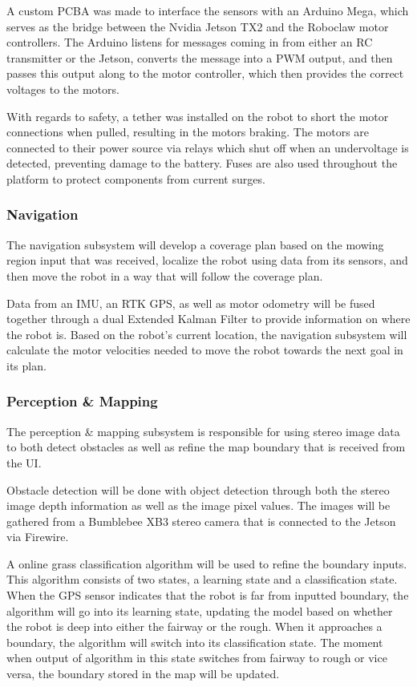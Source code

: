 \documentclass[12pt]{extarticle}
\begin{document}
  	  A custom PCBA was made to interface the sensors with an Arduino Mega, which serves as the bridge between the Nvidia Jetson TX2 and the Roboclaw motor controllers. The Arduino listens for messages coming in from either an RC transmitter or the Jetson, converts the message into a PWM output, and then passes this output along to the motor controller, which then provides the correct voltages to the motors. 
   
		With regards to safety, a tether was installed on the robot to short the motor connections when pulled, resulting in the motors braking. The motors are connected to their power source via relays which shut off when an undervoltage is detected, preventing damage to the battery. Fuses are also used throughout the platform to protect components from current surges. 
      

	 \subsubsection{Navigation}
 
      The navigation subsystem will develop a coverage plan based on the mowing region input that was received, localize the robot using data from its sensors, and then move the robot in a way that will follow the coverage plan. 
      
      Data from an IMU, an RTK GPS, as well as motor odometry will be fused together through a dual Extended Kalman Filter to provide information on where the robot is. Based on the robot's current location, the navigation subsystem will calculate the motor velocities needed to move the robot towards the next goal in its plan.
      
	\subsubsection{Perception \& Mapping}
    
    The perception \& mapping subsystem is responsible for using stereo image data to both detect obstacles as well as refine the map boundary that is received from the UI.  
    
    Obstacle detection will be done with object detection through both the stereo image depth information as well as the image pixel values. The images will be gathered from a Bumblebee XB3 stereo camera that is connected to the Jetson via Firewire. 
      
    A online grass classification algorithm will be used to refine the boundary inputs. This algorithm consists of two states, a learning state and a classification state. When the GPS sensor indicates that the robot is far from inputted boundary, the algorithm will go into its learning state, updating the model based on whether the robot is deep into either the fairway or the rough. When it approaches a boundary, the algorithm will switch into its classification state. The moment when output of algorithm in this state switches from fairway to rough or vice versa, the boundary stored in the map will be updated.  
\end{document}
